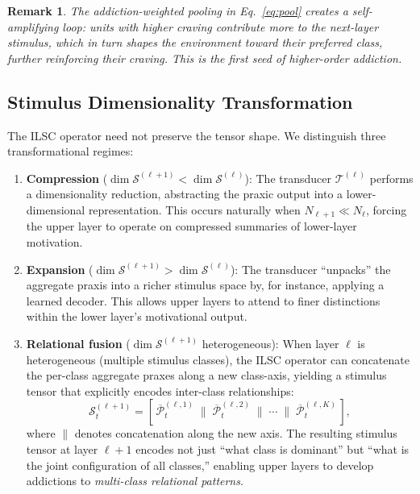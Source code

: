 \documentclass[12pt,a4paper]{article}
\newtheorem{remark}{Remark}
\newcommand{\tens}[1]{\boldsymbol{\mathcal{#1}}}
\begin{document}
\begin{remark}
The addiction-weighted pooling in Eq.~\eqref{eq:pool} creates a self-amplifying
loop: units with higher craving contribute more to the next-layer stimulus, which
in turn shapes the environment toward their preferred class, further reinforcing
their craving. This is the first seed of higher-order addiction.
\end{remark}

\subsection{Stimulus Dimensionality Transformation}

The ILSC operator need not preserve the tensor shape. We distinguish three
transformational regimes:

\begin{enumerate}
\item \textbf{Compression} ($\dim \tens{S}^{(\ell+1)} < \dim \tens{S}^{(\ell)}$):
The transducer $\mathcal{T}^{(\ell)}$ performs a dimensionality reduction,
abstracting the praxic output into a lower-dimensional representation. This occurs
naturally when $N_{\ell+1} \ll N_\ell$, forcing the upper layer to operate on
compressed summaries of lower-layer motivation.

\item \textbf{Expansion} ($\dim \tens{S}^{(\ell+1)} > \dim \tens{S}^{(\ell)}$):
The transducer ``unpacks'' the aggregate praxis into a richer stimulus space by,
for instance, applying a learned decoder. This allows upper layers to attend to
finer distinctions within the lower layer's motivational output.

\item \textbf{Relational fusion} ($\dim \tens{S}^{(\ell+1)}$ heterogeneous):
When layer $\ell$ is heterogeneous (multiple stimulus classes), the ILSC operator
can concatenate the per-class aggregate praxes along a new class-axis, yielding a
stimulus tensor that explicitly encodes inter-class relationships:
\begin{equation}
\tens{S}_t^{(\ell+1)} = \left[\,
\overline{\tens{P}}_t^{(\ell,1)}\;\|\;
\overline{\tens{P}}_t^{(\ell,2)}\;\|\;\cdots\;\|\;
\overline{\tens{P}}_t^{(\ell,K)}\,\right],
\label{eq:fusion}
\end{equation}
where $\|$ denotes concatenation along the new axis. The resulting stimulus
tensor at layer $\ell+1$ encodes not just ``what class is dominant'' but
``what is the joint configuration of all classes,'' enabling upper layers to
develop addictions to \textit{multi-class relational patterns}.
\end{enumerate}
\end{document}

